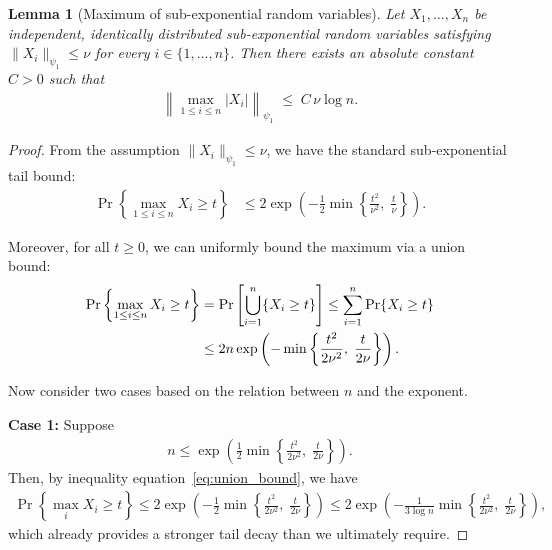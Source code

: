 \documentclass{article}
\def\eqref#1{equation~\ref{#1}}
\theoremstyle{plain}
\newtheorem{lemma}[theorem]{Lemma}
\theoremstyle{definition}
\theoremstyle{remark}
\begin{document}
\begin{lemma}[Maximum of sub-exponential random variables]\label{lem:max_subexp}
Let \(X_1,\dots,X_n\) be independent, identically distributed sub-exponential
random variables satisfying \(\|X_i\|_{\psi_1}\le\nu\) for every
\(i \in \{1,\dots,n\}\).  
Then there exists an absolute constant \(C>0\) such that
\begin{align*}
    \left\|\max_{1\le i\le n}\lvert X_i\rvert\right\|_{\psi_1}
    \;\le\; C\,\nu\log n .
\end{align*}
\end{lemma}

\begin{proof}
From the assumption \( \|X_i\|_{\psi_1} \leq \nu \), we have the standard sub-exponential tail bound:
\begin{align*}
    \Pr\left\{ \max_{1 \le i \le n} X_i \ge t \right\}
    &\le
    2\exp\left(
        -\frac{1}{2} \min\left\{
            \frac{t^2}{\nu^2},\;
            \frac{t}{\nu}
        \right\}
    \right).
\end{align*}

Moreover, for all \( t \ge 0 \), we can uniformly bound the maximum via a union bound:
\begin{align}
    \Pr\left\{ \max_{1 \le i \le n} X_i \ge t \right\}
    &= \Pr\left[ \bigcup_{i=1}^{n} \{ X_i \ge t \} \right]
    \le \sum_{i=1}^{n} \Pr\{ X_i \ge t \} \notag \\
    &\le
    2n \exp\left(
        -\min\left\{
            \frac{t^2}{2\nu^{2}},\;
            \frac{t}{2\nu}
        \right\}
    \right).
    \label{eq:union_bound}
\end{align}

Now consider two cases based on the relation between \( n \) and the exponent.

\smallskip
\textbf{Case 1:} Suppose
\begin{align*}
    n \le \exp\left(
        \frac{1}{2} \min\left\{
            \frac{t^2}{2\nu^{2}},\;
            \frac{t}{2\nu}
        \right\}
    \right).
\end{align*}
Then, by inequality \eqref{eq:union_bound}, we have
\begin{align*}
    \Pr\left\{ \max_{i} X_i \ge t \right\}
    \le
    2\exp\left(
        -\frac{1}{2} \min\left\{
            \frac{t^2}{2\nu^2},\;
            \frac{t}{2\nu}
        \right\}
    \right)
    \le
    2\exp\left(
        -\frac{1}{3\log n}
        \min\left\{
            \frac{t^2}{2\nu^2},\;
            \frac{t}{2\nu}
        \right\}
    \right),
\end{align*}
which already provides a stronger tail decay than we ultimately require.


\end{proof}
\end{document}
